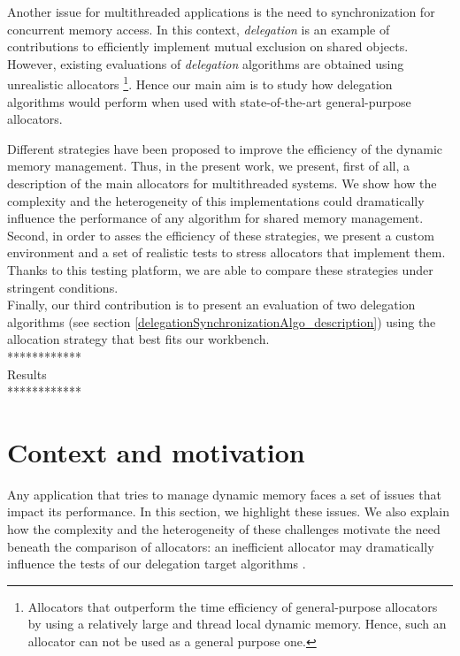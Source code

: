\documentclass[10pt]{article}											%
\begin{document}
Another issue for multithreaded applications is the need to synchronization for concurrent memory access.   In this context, \textit{delegation} is an example of contributions to efficiently implement mutual exclusion on shared objects.   However, existing evaluations of \textit{delegation} algorithms are obtained using unrealistic allocators \footnote{Allocators that outperform the time efficiency of general-purpose allocators by using a relatively large and thread local dynamic memory.   Hence, such an allocator can not be used as a general purpose one.}.   Hence our main aim is to study how delegation algorithms would perform when used with state-of-the-art general-purpose allocators.

Different strategies have been proposed to improve the efficiency of the dynamic memory management.   Thus, in the present work, we present, first of all, a description of the main allocators for multithreaded systems.   We show how the complexity and the heterogeneity of this implementations could dramatically influence the performance of any algorithm for shared memory management.\\
Second, in order to asses the efficiency of these strategies, we present a custom environment and a set of realistic tests to stress allocators that implement them.   Thanks to this testing platform, we are able to compare these strategies under stringent conditions.\\
Finally, our third contribution is to present an evaluation of two delegation algorithms (see section \ref{delegationSynchronizationAlgo_description}) using the allocation strategy that best fits our workbench.\\

************\\
Results\\
************\\




\section{Context and motivation}
Any application that tries to manage dynamic memory faces a set of issues that impact its performance.   In this section, we highlight these issues.   We also explain how the complexity and the heterogeneity of these challenges motivate the need beneath the comparison of allocators: an inefficient allocator may dramatically influence the tests of our delegation target algorithms \cite{delegationCS_roparsPetrovic}.
\end{document}
